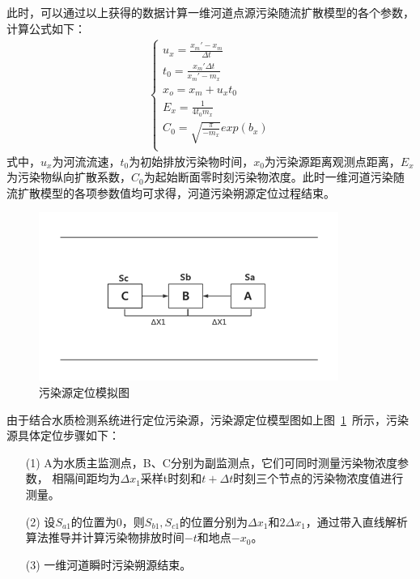 \documentclass{whutmod}
\begin{document}
	此时，可以通过以上获得的数据计算一维河道点源污染随流扩散模型的各个参数，计算公式如下：
			\begin{gather}
	\left\{\begin{matrix}
	 u_{x}=\frac{{x_{m}}'-x_{m}}{\Delta t}	\\
	t_{0}=\frac{{x_{m}}'\Delta t}{{x_{m}}'-m_{x}}\\
	x_{o}=x_{m}+u_{x}t_{0} \\
	E_{x}=\frac{1}{4t_{0}m_{x}}\\
	C_{0}=\sqrt{\frac{\pi}{-m_{x}}}exp(b_{x})\\
	\end{matrix}\right.\label{9999}
	\end{gather}
	式中，$u_{x}$为河流流速，$t_{0}$为初始排放污染物时间，$x_{0}$为污染源距离观测点距离，$E_{x}$为污染物纵向扩散系数，$C_{0}$为起始断面零时刻污染物浓度。此时一维河道污染随流扩散模型的各项参数值均可求得，河道污染朔源定位过程结束。
	
			\begin{figure}[H]
		\centering
		\includegraphics[width=\textwidth]{figures/wrydw.png}
		\caption{污染源定位模拟图}\label{wrydw}
	\end{figure}

由于结合水质检测系统进行定位污染源，污染源定位模型图如上图~\ref{wrydw}~所示，污染源具体定位步骤如下：
		\begin{itemize}
	\item [(1)] A为水质主监测点，B、C分别为副监测点，它们可同时测量污染物浓度参数，
	相隔间距均为$\Delta x_{1}$采样t时刻和$t+\Delta t$时刻三个节点的污染物浓度值进行测量。
	\item [(2)] 
设$S_{a1}$的位置为0，则$S_{b1},S_{c1}$的位置分别为$\Delta x_{1}$和$2\Delta x_{1}$，通过带入直线解析算法推导并计算污染物排放时间$-t$和地点$-x_{0}$。
	\item [(3)]一维河道瞬时污染朔源结束。
\end{itemize}
\end{document}
